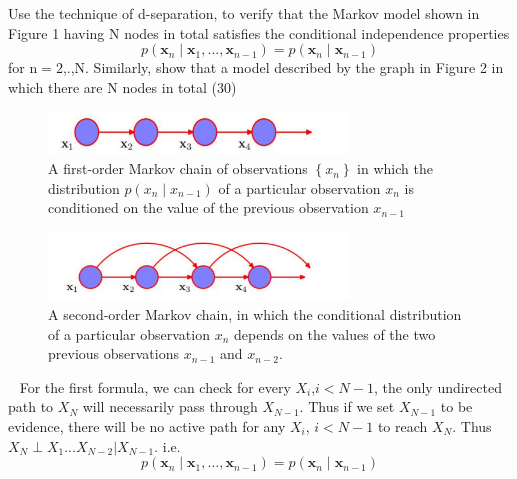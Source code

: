 \begin{exercise}{Use the technique of d-separation, to verify that the Markov model shown in Figure 1 having $\mathrm{N}$ nodes in total satisfies the conditional independence properties
    $$
    p\left(\boldsymbol{x}_{n} \mid \boldsymbol{x}_{1}, \ldots, \boldsymbol{x}_{n-1}\right)=p\left(\boldsymbol{x}_{n} \mid \boldsymbol{x}_{n-1}\right)
    $$
    for $\mathrm{n}=2$,.,N. Similarly, show that a model described by the graph in Figure 2 in which there are $\mathrm{N}$ nodes in total (30)

    \begin{figure}[h]
        \centering
        \includegraphics[width=8cm]{img/ex3-2.jpg}
        \caption{A first-order Markov chain of observations $\left\{x_{n}\right\}$ in which the distribution $p\left(x_{n} \mid x_{n-1}\right)$ of a particular observation $x_{n}$ is conditioned on the value of the previous observation $x_{n-1}$}
    \end{figure}

    \begin{figure}[h]
        \centering
        \includegraphics[width=8cm]{img/ex3-3.jpg}
        \caption{A second-order Markov chain, in which the conditional distribution of a particular observation $x_{n}$ depends on the values of the two previous observations $x_{n-1}$ and $x_{n-2}$.
        }
    \end{figure}
    
    }
  \begin{solution}
  \par{~}
  For the first formula, we can check for every $X_i$,$i<N-1$, the only undirected path to $X_N$ will necessarily pass through $X_{N-1}$. Thus if we set $X_{N-1}$ to be evidence, there will be no active path for any $X_i$, $i<N-1$ to reach $X_N$. Thus $X_N \perp X_{1} ... X_{N-2} | X_{N-1}$. i.e. 
  $$
    p\left(\boldsymbol{x}_{n} \mid \boldsymbol{x}_{1}, \ldots, \boldsymbol{x}_{n-1}\right)=p\left(\boldsymbol{x}_{n} \mid \boldsymbol{x}_{n-1}\right)
    $$


\end{solution}
\end{exercise}
